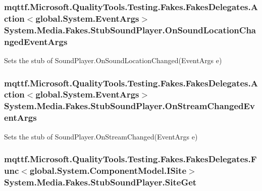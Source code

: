 \hypertarget{class_system_1_1_media_1_1_fakes_1_1_stub_sound_player_aec86b91a0eb444e299560a898fdcaa4c}{
\subsubsection[{On\-Sound\-Location\-Changed\-Event\-Args}]{\setlength{\rightskip}{0pt plus 5cm}mqttf.\-Microsoft.\-Quality\-Tools.\-Testing.\-Fakes.\-Fakes\-Delegates.\-Action$<$global.\-System.\-Event\-Args$>$ System.\-Media.\-Fakes.\-Stub\-Sound\-Player.\-On\-Sound\-Location\-Changed\-Event\-Args}}\label{class_system_1_1_media_1_1_fakes_1_1_stub_sound_player_aec86b91a0eb444e299560a898fdcaa4c}


Sets the stub of Sound\-Player.\-On\-Sound\-Location\-Changed(\-Event\-Args e)

\hypertarget{class_system_1_1_media_1_1_fakes_1_1_stub_sound_player_a680549744b5cd2e0d578aedaf750e229}{
\subsubsection[{On\-Stream\-Changed\-Event\-Args}]{\setlength{\rightskip}{0pt plus 5cm}mqttf.\-Microsoft.\-Quality\-Tools.\-Testing.\-Fakes.\-Fakes\-Delegates.\-Action$<$global.\-System.\-Event\-Args$>$ System.\-Media.\-Fakes.\-Stub\-Sound\-Player.\-On\-Stream\-Changed\-Event\-Args}}\label{class_system_1_1_media_1_1_fakes_1_1_stub_sound_player_a680549744b5cd2e0d578aedaf750e229}


Sets the stub of Sound\-Player.\-On\-Stream\-Changed(\-Event\-Args e)

\hypertarget{class_system_1_1_media_1_1_fakes_1_1_stub_sound_player_aa1edf1cb536d521b813b41f70039a644}{
\subsubsection[{Site\-Get}]{\setlength{\rightskip}{0pt plus 5cm}mqttf.\-Microsoft.\-Quality\-Tools.\-Testing.\-Fakes.\-Fakes\-Delegates.\-Func$<$global.\-System.\-Component\-Model.\-I\-Site$>$ System.\-Media.\-Fakes.\-Stub\-Sound\-Player.\-Site\-Get}}\label{class_system_1_1_media_1_1_fakes_1_1_stub_sound_player_aa1edf1cb536d521b813b41f70039a644}


